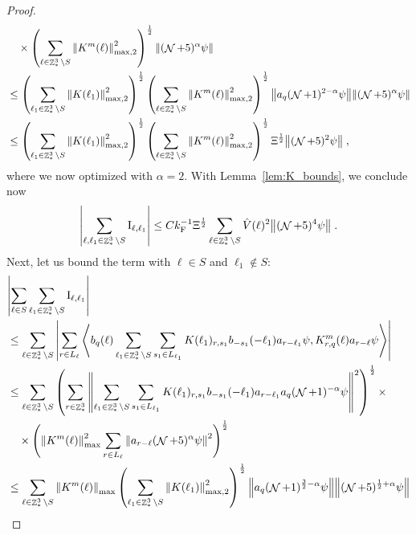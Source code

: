 \documentclass[sn-mathphys, Numbered ,a4paper]{sn-jnl}%
\DeclareMathOperator{\Z}{\mathbb{Z}}
\DeclareMathOperator{\NN}{\mathcal{N}}
\newcommand{\eva}[1]{\left\langle #1 \right\rangle}
\newcommand{\F}{\mathrm{F}}
\newcommand{\I}{\mathrm{I}}
\theoremstyle{plain}
\theoremstyle{definition}
\theoremstyle{remark}
\theoremstyle{plain}
\theoremstyle{definition}
\theoremstyle{remark}
\begin{document}
\begin{proof}
\begin{align}
    	&\quad \times \left( \sum_{\ell \in \Z^3_* \setminus S} \norm{K^m(\ell)}_{\max,2}^2 \right)^{\frac 12}
    		\norm{ (\NN+5)^{\alpha}\psi }  \nonumber\\
    	&\leq \left( \sum_{\ell_1 \in \Z^3_* \setminus S} \norm{K(\ell_1)}_{\max,2}^2 \right)^{\frac 12}
    		\left( \sum_{\ell \in \Z^3_* \setminus S} \norm{K^m(\ell)}_{\max,2}^2 \right)^{\frac 12}
    		\norm{ a_q (\NN+1)^{2-\alpha} \psi}
    		\norm{ (\NN+5)^{\alpha}\psi }  \nonumber\\
    &\leq \left( \sum_{\ell_1 \in \Z^3_* \setminus S} \norm{K(\ell_1)}_{\max,2}^2 \right)^{\frac 12}
    		\left( \sum_{\ell \in \Z^3_* \setminus S} \norm{K^m(\ell)}_{\max,2}^2 \right)^{\frac 12}
    		\Xi^{\frac 12}
    		\norm{ (\NN+5)^2 \psi } \;,
\end{align}
where we now optimized with $ \alpha = 2 $. With Lemma~\ref{lem:K_bounds}, we conclude now
\begin{equation}
	\abs{\sum_{\ell, \ell_1 \in \Z^3_* \setminus S} \I_{\ell,\ell_1}}
	\le C k_{\F}^{-1} \Xi^{\frac 12}
		\sum_{\ell \in \Z^3_* \setminus S} \hat{V}(\ell)^2
		 \norm{(\NN+5)^4 \psi} \;.
\end{equation}
Next, let us bound the term with $ \ell \in S $ and $ \ell_1 \notin S $:
\begin{align}
	&\abs{\sum_{\ell \in S} \sum_{\ell_1 \in \Z^3_* \setminus S} \I_{\ell,\ell_1}} \nonumber\\
	&\leq \sum_{\ell \in \Z^3_* \setminus S} \abs{ \sum\limits_{r \in L_\ell} \eva{ b_{q}(\ell)
    		\sum\limits_{\ell_1 \in \Z^3_* \setminus S}  \sum\limits_{s_1 \in L_{\ell_1}} K(\ell_1)_{r,s_1} b_{-s_1}(-\ell_1) a_{r-\ell_1} \psi, 
    		 K^m_{r,q}(\ell) a_{r-\ell} \psi }}\nonumber\\
    	&\leq \sum_{\ell \in \Z^3_* \setminus S} \left( \sum_{r \in \Z^3_*}
    		\norm{\sum\limits_{\ell_1 \in \Z^3_* \setminus S} \sum_{s_1 \in L_{\ell_1}} K(\ell_1)_{r,s_1} b_{-s_1}(-\ell_1) a_{r-\ell_1} a_q (\NN+1)^{-\alpha} \psi}^2 \right)^{\frac 12} \times \nonumber\\
    	&\quad \times \left( \norm{K^m(\ell)}_{\max}^2
    		\sum_{r \in L_\ell} \norm{ a_{r-\ell} (\NN+5)^{\alpha}\psi }^2 \right)^{\frac 12} \nonumber\\
    	&\leq \sum_{\ell \in \Z^3_* \setminus S} \norm{K^m(\ell)}_{\max}
    	\left( \sum_{\ell_1 \in \Z^3_* \setminus S} \norm{K(\ell_1)}_{\max,2}^2 \right)^{\frac 12}
    		\norm{ a_q (\NN+1)^{\frac 32-\alpha} \psi}
    		\norm{ (\NN+5)^{\frac 12+\alpha}\psi }  \nonumber\\

\end{align}
\end{proof}
\end{document}
